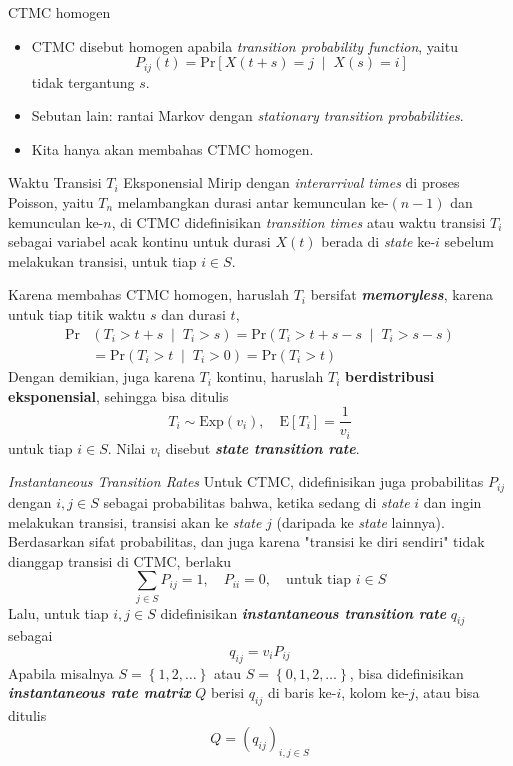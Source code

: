 \documentclass{beamer}
\newcommand{\pars}[1]{\left(#1\right)}
\newcommand{\brackets}[1]{\left[#1\right]}
\newcommand{\braces}[1]{\left\{#1\right\}}
\begin{document}
\begin{frame}{CTMC homogen}
    \begin{itemize}
        \item CTMC disebut homogen apabila \textit{transition probability function}, yaitu
        \[P_{ij}\pars{t} = \text{Pr}\brackets{X\pars{t+s} = j \; \middle| \; X\pars{s} = i}\]
        tidak tergantung \(s\).
        \item Sebutan lain: rantai Markov dengan \textit{stationary transition probabilities}.
        \item Kita hanya akan membahas CTMC homogen.
    \end{itemize}
\end{frame}

\begin{frame}{Waktu Transisi \(T_i\) Eksponensial}
    Mirip dengan \textit{interarrival times} di proses Poisson, yaitu \(T_n\) melambangkan durasi antar kemunculan ke-\((n-1)\) dan kemunculan ke-\(n\), di CTMC didefinisikan \textit{transition times} atau waktu transisi \(T_i\) sebagai variabel acak kontinu untuk durasi \(X(t)\) berada di \textit{state} ke-\(i\) sebelum melakukan transisi, untuk tiap \(i \in S\).

    Karena membahas CTMC homogen, haruslah \(T_i\) bersifat \textbf{\textit{memoryless}}, karena untuk tiap titik waktu \(s\) dan durasi \(t\),
    \begin{align*}
        \text{Pr}&\pars{T_i > t + s \; \middle| \; T_i > s} = \text{Pr}\pars{T_i > t + s - s \; \middle| \; T_i > s - s} \\
        &= \text{Pr}\pars{T_i > t \; \middle| \; T_i > 0} = \text{Pr}\pars{T_i > t}
    \end{align*}
    Dengan demikian, juga karena \(T_i\) kontinu, haruslah \(T_i\) \textbf{berdistribusi eksponensial}, sehingga bisa ditulis
    \[T_i \sim \text{Exp}\pars{v_i}, \quad \text{E}\brackets{T_i} = \frac{1}{v_i}\] 
    untuk tiap \(i \in S\). Nilai \(v_i\) disebut \textbf{\textit{state transition rate}}.
\end{frame}

\begin{frame}{\textit{Instantaneous Transition Rates}}
    Untuk CTMC, didefinisikan juga probabilitas \(P_{ij}\) dengan \(i, j \in S\) sebagai probabilitas bahwa, ketika sedang di \textit{state} \(i\) dan ingin melakukan transisi, transisi akan ke \textit{state} \(j\) (daripada ke \textit{state} lainnya). Berdasarkan sifat probabilitas, dan juga karena "transisi ke diri sendiri" tidak dianggap transisi di CTMC, berlaku
    \[\sum_{j\in S} P_{ij} = 1, \quad P_{ii} = 0, \quad \text{untuk tiap } i \in S\]
    Lalu, untuk tiap \(i, j \in S\) didefinisikan \textbf{\textit{instantaneous transition rate}} \(q_{ij}\) sebagai
    \[q_{ij} = v_i P_{ij}\]
    Apabila misalnya \(S = \braces{1, 2, \dots}\) atau \(S = \braces{0, 1, 2, \dots}\), bisa didefinisikan \textbf{\textit{instantaneous rate matrix}} \(Q\) berisi \(q_{ij}\) di baris ke-\(i\), kolom ke-\(j\), atau bisa ditulis
    \[Q = \pars{q_{ij}}_{i,j \in S}\]
\end{frame}
\end{document}
